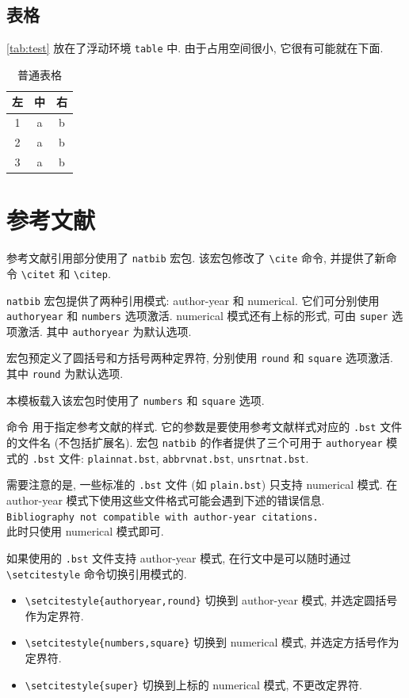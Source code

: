 \subsection{表格}

\autoref{tab:test} 放在了浮动环境 \verb|table| 中.
由于占用空间很小, 它很有可能就在下面.

\begin{table}[!htb]
  \caption{普通表格}
  \label{tab:test}
  \centering
  \begin{tabular}{ccc}
    \toprule
    左 & 中 & 右\\
    \midrule
    1  & a  & b\\
    2  & a  & b\\
    3  & a  & b\\
    \bottomrule
  \end{tabular}
\end{table}

\section{参考文献}
\label{sec:bib}

参考文献引用部分使用了 \verb|natbib| 宏包.
该宏包修改了 \verb|\cite| 命令, 并提供了新命令 \verb|\citet| 和 \verb|\citep|.

\verb|natbib| 宏包提供了两种引用模式: author-year 和 numerical.
它们可分别使用 \verb|authoryear| 和 \verb|numbers| 选项激活.
numerical 模式还有上标的形式, 可由 \verb|super| 选项激活.
其中 \verb|authoryear| 为默认选项.

宏包预定义了圆括号和方括号两种定界符, 分别使用 \verb|round| 和 \verb|square| 选项激活.
其中 \verb|round| 为默认选项.

本模板载入该宏包时使用了 \verb|numbers| 和 \verb|square| 选项.

命令 \verb|| 用于指定参考文献的样式. 它的参数是要使用参考文献样式对应的 \verb|.bst| 文件的文件名 (不包括扩展名). 宏包 \verb|natbib| 的作者提供了三个可用于 \verb|authoryear| 模式的 \verb|.bst| 文件: \verb|plainnat.bst|, \verb|abbrvnat.bst|, \verb|unsrtnat.bst|.

需要注意的是, 一些标准的 \verb|.bst| 文件 (如 \verb|plain.bst|) 只支持 numerical 模式.
在 author-year 模式下使用这些文件格式可能会遇到下述的错误信息.\\
\verb|Bibliography not compatible with author-year citations.|\\
此时只使用 numerical 模式即可.

如果使用的 \verb|.bst| 文件支持 author-year 模式,
在行文中是可以随时通过 \verb|\setcitestyle| 命令切换引用模式的.
\begin{itemize}
  \item
    \verb|\setcitestyle{authoryear,round}| 切换到 author-year 模式,
    并选定圆括号作为定界符.
  \item
    \verb|\setcitestyle{numbers,square}| 切换到 numerical 模式,
    并选定方括号作为定界符.
  \item
    \verb|\setcitestyle{super}| 切换到上标的 numerical 模式,
    不更改定界符.
\end{itemize}

